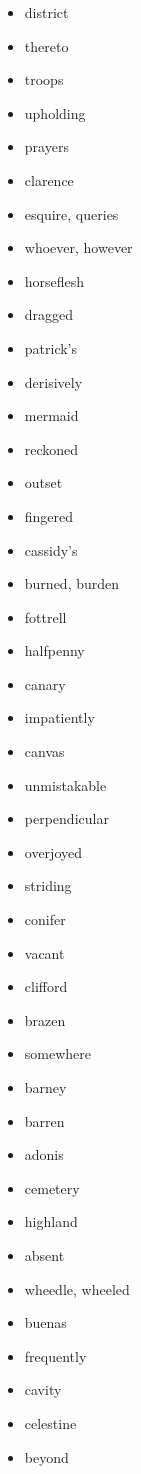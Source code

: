 \documentclass{article}
\begin{document}
\begin{itemize}
    \item district
    \item thereto
    \item troops
    \item upholding
    \item prayers
    \item clarence
    \item esquire, queries
    \item whoever, however
    \item horseflesh
    \item dragged
    \item patrick's
    \item derisively
    \item mermaid
    \item reckoned
    \item outset
    \item fingered
    \item cassidy's
    \item burned, burden
    \item fottrell
    \item halfpenny
    \item canary
    \item impatiently
    \item canvas
    \item unmistakable
    \item perpendicular
    \item overjoyed
    \item striding
    \item conifer
    \item vacant
    \item clifford
    \item brazen
    \item somewhere
    \item barney
    \item barren
    \item adonis
    \item cemetery
    \item highland
    \item absent
    \item wheedle, wheeled
    \item buenas
    \item frequently
    \item cavity
    \item celestine
    \item beyond

\end{itemize}
\end{document}
